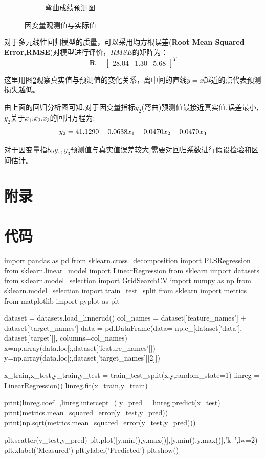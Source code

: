 \documentclass[a4paper,12pt]{article}
\begin{document}
\begin{figure}[!h]
\begin{subfigure}{0.48\textwidth}
		\caption{弯曲成绩预测图}
		\label{fig:sub2}
	\end{subfigure}
	\caption{
		\label{fig:total}
		因变量观测值与实际值
	}
\end{figure}
对于多元线性回归模型的质量，可以采用均方根误差(\textbf{Root Mean Squared Error,RMSE})对模型进行评价，$RMSE$的矩阵为：
$$
\boldsymbol{R}=\left[\begin{array}{ccc}
	28.04&1.30&5.68
\end{array}\right]^{T}
$$

这里用图\ref{fig:total}观察真实值与预测值的变化关系，离中间的直线$y=x$越近的点代表预测损失越低。

由上面的回归分析图可知,对于因变量指标$y_2$(弯曲)预测值最接近真实值,误差最小,$y_2$关于$x_1$,$x_2$,$x_3$的回归方程为:
$$
y_2 = 41.1290 -0.0638x_1 -0.0470x_2 -0.0470x_3\\
$$

对于因变量指标$y_1,y_3$预测值与真实值误差较大,需要对回归系数进行假设检验和区间估计。

\newpage

\section*{附录}
\appendix

\section{代码}
\begin{python}
import pandas as pd
from sklearn.cross_decomposition import PLSRegression
from sklearn.linear_model import LinearRegression
from sklearn import datasets
from sklearn.model_selection import GridSearchCV
import numpy as np
from sklearn.model_selection import train_test_split
from sklearn import metrics
from matplotlib import pyplot as plt

dataset = datasets.load_linnerud()
col_names = dataset['feature_names'] + dataset['target_names']
data = pd.DataFrame(data= np.c_[dataset['data'], dataset['target']], columns=col_names)
x=np.array(data.loc[:,dataset['feature_names']])
y=np.array(data.loc[:,dataset['target_names'][2]])

x_train,x_test,y_train,y_test = train_test_split(x,y,random_state=1)
linreg = LinearRegression()
linreg.fit(x_train,y_train)

print(linreg.coef_,linreg.intercept_)
y_pred = linreg.predict(x_test)
print(metrics.mean_squared_error(y_test,y_pred))
print(np.sqrt(metrics.mean_squared_error(y_test,y_pred)))

plt.scatter(y_test,y_pred)
plt.plot([y.min(),y.max()],[y.min(),y.max()],'k--',lw=2)
plt.xlabel('Measured')
plt.ylabel('Predicted')
plt.show()
\end{python}
\end{document}
